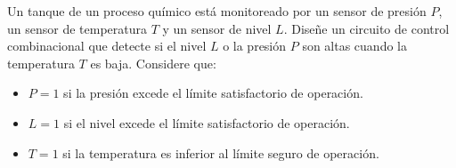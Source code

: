 \documentclass[addpoints]{exam}
\begin{document}
\begin{questions}

  \question Un tanque de un proceso químico está monitoreado por un
  sensor de presión $P$, un sensor de temperatura $T$ y un sensor de
  nivel $L$. Diseñe un circuito de control combinacional que detecte
  si el nivel $L$ o la presión $P$ son altas cuando la temperatura $T$
  es baja. Considere que:
  \begin{itemize}
  \item $P=1$ si la presión excede el límite satisfactorio de
    operación.
  \item $L=1$ si el nivel excede el límite satisfactorio de operación.
  \item $T=1$ si la temperatura es inferior al límite seguro de
    operación.
  \end{itemize}

\droptotalpoints %




\end{questions}
\end{document}
